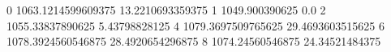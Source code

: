 0 1063.1214599609375 13.2210693359375
1 1049.900390625 0.0
2 1055.33837890625 5.43798828125
4 1079.3697509765625 29.4693603515625
6 1078.3924560546875 28.4920654296875
8 1074.24560546875 24.34521484375
